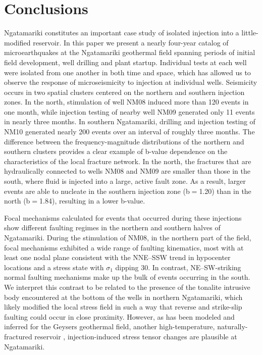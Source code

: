 \section{Conclusions}
Ngatamariki constitutes an important case study of isolated injection into a little-modified reservoir. In this paper we present a nearly four-year catalog of microearthquakes at the Ngatamariki geothermal field spanning periods of initial field development, well drilling and plant startup. Individual tests at each well were isolated from one another in both time and space, which has allowed us to observe the response of microseismicity to injection at individual wells. Seismicity occurs in two spatial clusters centered on the northern and southern injection zones. In the north, stimulation of well NM08 induced more than 120 events in one month, while injection testing of nearby well NM09 generated only 11 events in nearly three months. In southern Ngatamariki, drilling and injection testing of NM10 generated nearly 200 events over an interval of roughly three months. The difference between the frequency-magnitude distributions of the northern and southern clusters provides a clear example of b-value dependence on the characteristics of the local fracture network. In the north, the fractures that are hydraulically connected to wells NM08 and NM09 are smaller than those in the south, where fluid is injected into a large, active fault zone. As a result, larger events are able to nucleate in the southern injection zone (b$=$1.20) than in the north (b$=$1.84), resulting in a lower b-value.

Focal mechanisms calculated for events that occurred during these injections show different faulting regimes in the northern and southern halves of Ngatamariki. During the stimulation of NM08, in the northern part of the field, focal mechanisms exhibited a wide range of faulting kinematics, most with at least one nodal plane consistent with the NNE--SSW trend in hypocenter locations and a stress state with $\sigma_{1}$ dipping 30\textdegree. In contrast, NE--SW-striking normal faulting mechanisms make up the bulk of events occurring in the south. We interpret this contrast to be related to the presence of the tonalite intrusive body encountered at the bottom of the wells in northern Ngatamariki, which likely modified the local stress field in such a way that reverse and strike-slip faulting could occur in close proximity. However, as has been modeled and inferred for the Geysers geothermal field, another high-temperature, naturally-fractured reservoir \citep{Mart_nez_Garz_n_2014,Jeanne_2015tensor}, injection-induced stress tensor changes are plausible at Ngatamariki.

